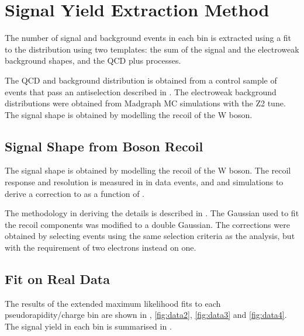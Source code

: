 \section{Signal Yield Extraction Method}
The number of signal and background events in each bin is extracted using a fit
to the \ETm distribution using two templates: the sum of the \Wenu signal and
the {electroweak} background shapes, and the {QCD} plus \gjet processes.

The {QCD} and \gjet background distribution is obtained from a control sample of
events that pass an antiselection described in .
The {electroweak} background \ETm distributions were obtained from Madgraph {MC}
simulations with the Z2 tune.
The signal \ETm shape is obtained by modelling the recoil of the W boson. 

\subsection{Signal \ETm Shape from Boson Recoil}
The signal \ETm shape is obtained by modelling the recoil of the W boson.  The
recoil response and resolution is measured in in \HepProcess{\PZ\to\Pe\Pe} data
events, and \PW and  simulations to derive a correction to \ETm as a
function of \PW \pT \cite{bauer2010modeling,alcaraz2010updated}.

The methodology in deriving the details is described in .
The Gaussian used to fit the recoil components was modified to a double
Gaussian. 
The corrections were obtained by selecting \HepProcess{\PZ\to\Pe\Pe} events
using the same selection criteria as the analysis, but with the requirement of
two electrons instead on one.

\subsection{Fit on Real Data}
The results of the extended maximum likelihood fits to each pseudorapidity/charge
bin are shown in , \ref{fig:data2}, \ref{fig:data3} and
\ref{fig:data4}.
The signal yield in each bin is summarised in  .

